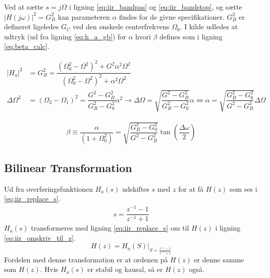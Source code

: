     Ved at sætte $s = j \Omega$ i ligning \ref{eq:iir_bandpas} og \ref{eq:iir_bandstop}, og sætte $\big| H(j\omega)\big|^2 = G_B^2$ kan parameteren $\alpha$ findes for de givne specifikationer. $G_B^2$ er defineret ligeledes $G_C$ ved den ønskede centerfrekvens $\Omega_0$.
   I kilde \cite{Orfanidis1996} udledes at udtryk (ud fra ligning \ref{eq:h_a_gb}) for $\alpha$ hvori $\beta$ defines som i ligning \ref{eq:beta_calc}. 

    \begin{align}
        |H_{a}|^2 &= G_B^2 =  \dfrac{(\Omega_0^2- \Omega^2)^2 + G^2 \alpha^2 \Omega^2}{(\Omega_0^2-\Omega^2)^2 +\alpha^2 \Omega^2}  %
        \label{eq:h_a_gb}\\
       \Delta \Omega^2 &= (\Omega_2 - \Omega_1 )^2 = \dfrac{G^2 - G_B^2}{G_B^2 - G_0^2}  \alpha^2 \rightarrow \Delta \Omega = \sqrt{\dfrac{G^2 - G_B^2}{G_B^2 - G_0^2}} \alpha \iff \alpha = \sqrt{\dfrac{G_B^2-G_0^2}{G^2 - G_B^2 }} \Delta \Omega
       \label{eq:beta_calc}
    \end{align}


    \begin{align}
    \beta \equiv \dfrac{\alpha}{(1 + \Omega_0^2)}    = \sqrt{\dfrac{G_B^2-G_0^2}{G^2 - G_B^2 }} \tan \left( \dfrac{\Delta \omega}{2} \right) \label{eq:beta}
    \end{align}


    \subsection{Bilinear Transformation}
    Ud fra overføringsfunktionen $H_a(s)$ udskiftes $s$ med $z$ for at få $H(z)$ som ses i \ref{eq:iir_replace_s}.
    \begin{align}
    s =   \dfrac{z^{-1} - 1}{z^{-1} + 1} \label{eq:iir_replace_s}
    \end{align}
	$H_a(s)$ transformeres med ligning \ref{eq:iir_replace_s} om til $H(z)$ i ligning \ref{eq:iir_omskriv_til_z}.
    \begin{equation}
    H(z) = H_a(S)\bigg|_{S = \frac{z^{-1} -1 }{z^{-1} + 1}} \label{eq:iir_omskriv_til_z}
    \end{equation}
    Fordelen med denne transformation er at ordenen på $H(z)$ er denne samme som $H(z)$. Hvis $H_a(s)$ er stabil og kausal, så er $H(z)$ også.
    
